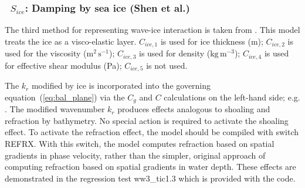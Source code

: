 \vsssub
\subsubsection{~$S_{ice}$: Damping by sea ice (Shen et al.)} \label{sec:ICE3}
\vsssub


\noindent
The third method for representing wave-ice interaction is taken from\linebreak
\cite{art:WS10}. This model treats the ice as a visco-elastic
layer. ${C_{ice,1}}$ is used for ice thickness (m); ${C_{ice,2}}$ is used for
the viscosity ($\mathrm{m^2\,s^{-1}}$); ${C_{ice,3}}$ is used for density
($\mathrm{kg\,m^{-3}}$); ${C_{ice,4}}$ is used for effective shear modulus
(Pa); ${C_{ice,5}}$ is not used.

The ${k_r}$ modified by ice is incorporated into the governing
equation~(\ref{eq:bal_plane}) via the $C_g$ and $C$ calculations on the
left-hand side; e.g. \citet[][and subsequent unpublished work]{art:RH09}.  The
modified wavenumber ${k_r}$ produces effects analogous to shoaling and
refraction by bathymetry. No special action is required to activate the
shoaling effect. To activate the refraction effect, the model should be
compiled with switch {\code REFRX}. With this switch, the model computes
refraction based on spatial gradients in phase velocity, rather than the
simpler, original approach of computing refraction based on spatial gradients
in water depth. These effects are demonstrated in the regression test {\file
ww3\_tic1.3} which is provided with the code.
